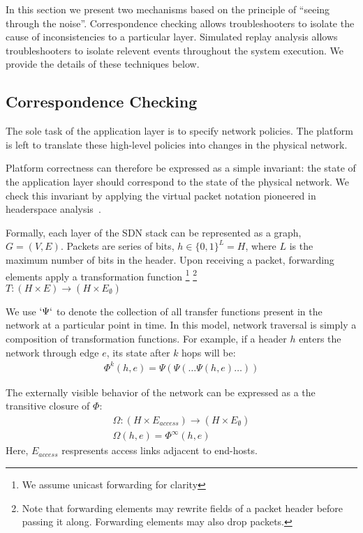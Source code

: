 In this section we present two mechanisms based on the principle of ``seeing
through the noise''. Correspondence checking allows troubleshooters to isolate
the cause of inconsistencies to a particular layer. Simulated replay analysis 
allows troubleshooters to isolate relevent events throughout the system
execution. We provide the details of these techniques below. 

\subsection{Correspondence Checking}

The sole task of the application layer is to specify network
policies. The platform is left to translate these high-level policies
into changes in the physical network.

Platform correctness can therefore be expressed as a simple invariant:
the state of the application layer should correspond to the state of the
physical network. We check this invariant by applying the virtual packet notation pioneered
in headerspace analysis~\cite{hsa}. 

Formally, each layer of the SDN stack can be represented as a graph,
$G = (V, E)$. Packets are series of bits, $h \in \{0,1\}^L = H$,
where $L$ is the maximum number of bits in the header. Upon receiving a packet,
forwarding elements apply a transformation function \footnote{We assume unicast forwarding for clarity}
\footnote{Note that forwarding elements may rewrite fields of a packet header
before passing it along. Forwarding elements may also drop packets.} \\
$T: (H \times E) \rightarrow (H \times E_{\emptyset})$

We use $`\Psi`$ to denote the collection of all transfer functions present in
the network at a particular point in time. In this model, network traversal is simply a composition of transformation
functions. For example, if a header $h$ enters the network through edge
$e$, its state after $k$ hops will be:
\begin{align*}
\Phi^k(h,e) = \Psi(\Psi(\dots \Psi(h,e)\dots))
\end{align*}

The externally visible behavior of the network can be expressed as a the
transitive closure of $\Phi$:
\begin{align*}
\Omega: (H \times E_{access}) \rightarrow (H \times E_{\emptyset}) \\
\Omega(h,e) = \Phi^{\infty}(h,e)
\end{align*}
Here, $E_{access}$ respresents access links adjacent to end-hosts.

